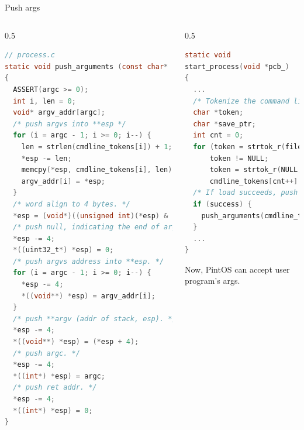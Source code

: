 \documentclass[10pt]{beamer}
\begin{document}
\begin{frame}[fragile]{Push args}
\begin{columns}
\begin{column}{0.5\textwidth}
\begin{lstlisting}[language=C]
// process.c
static void push_arguments (const char* cmdline_tokens[], int argc, void **esp)
{
  ASSERT(argc >= 0);
  int i, len = 0;
  void* argv_addr[argc];
  /* push argvs into **esp */
  for (i = argc - 1; i >= 0; i--) {
    len = strlen(cmdline_tokens[i]) + 1;
    *esp -= len;
    memcpy(*esp, cmdline_tokens[i], len);
    argv_addr[i] = *esp;
  }
  /* word align to 4 bytes. */
  *esp = (void*)((unsigned int)(*esp) & 0xfffffffc);
  /* push null, indicating the end of argv. */
  *esp -= 4;
  *((uint32_t*) *esp) = 0;
  /* push argvs address into **esp. */
  for (i = argc - 1; i >= 0; i--) {
    *esp -= 4;
    *((void**) *esp) = argv_addr[i];
  }
  /* push **argv (addr of stack, esp). */
  *esp -= 4;
  *((void**) *esp) = (*esp + 4);
  /* push argc. */
  *esp -= 4;
  *((int*) *esp) = argc;
  /* push ret addr. */
  *esp -= 4;
  *((int*) *esp) = 0;
}
\end{lstlisting}
\end{column}
\begin{column}{0.5\textwidth}
\begin{lstlisting}[language=C]
static void
start_process(void *pcb_)
{
  ...
  /* Tokenize the command line. */
  char *token;
  char *save_ptr;
  int cnt = 0;
  for (token = strtok_r(file_name, " ", &save_ptr); 
      token != NULL;
      token = strtok_r(NULL, " ", &save_ptr))      
      cmdline_tokens[cnt++] = token;
  /* If load succeeds, push arguments to the stack. */
  if (success) {
    push_arguments(cmdline_tokens, cnt, &if_.esp);
  }
  ...
}
\end{lstlisting}
Now, PintOS can accept user program's args.
\end{column}
\end{columns}
\end{frame}
\end{document}
